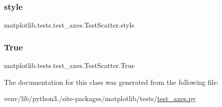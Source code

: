 \subsubsection{\texorpdfstring{style}{style}}
{\footnotesize\ttfamily matplotlib.\+tests.\+test\+\_\+axes.\+Test\+Scatter.\+style\hspace{0.3cm}{\ttfamily [static]}}

\mbox{\label{classmatplotlib_1_1tests_1_1test__axes_1_1TestScatter_a9727c719633231634050251cfc6a5555}} 
\subsubsection{\texorpdfstring{True}{True}}
{\footnotesize\ttfamily matplotlib.\+tests.\+test\+\_\+axes.\+Test\+Scatter.\+True\hspace{0.3cm}{\ttfamily [static]}}



The documentation for this class was generated from the following file\+:\begin{DoxyCompactItemize}
\item 
venv/lib/python3./site-\/packages/matplotlib/tests/\hyperlink{test__axes_8py}{test\+\_\+axes.\+py}\end{DoxyCompactItemize}
